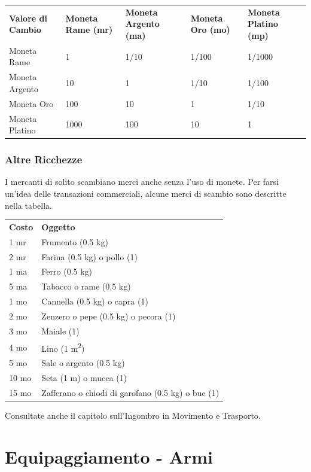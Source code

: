 \documentclass[a4paper,11pt,twoside,openany]{book}
\begin{document}
\begin{tabular}{L{3cm} L{3cm} L{3cm} L{3cm} L{3cm}}
	\toprule
	\textbf{Valore di Cambio} & \textbf{Moneta Rame (mr)} & \textbf{Moneta Argento (ma)} & \textbf{Moneta Oro (mo)} & \textbf{Moneta Platino (mp)}\\
	Moneta Rame& 1& 1/10& 1/100& 1/1000\\
	Moneta Argento  & 10    & 1   & 1/10 & 1/100\\
	Moneta Oro & 100   & 10  & 1    & 1/10\\
	Moneta Platino  & 1000  & 100 & 10   & 1\\
\end{tabular}

\subsubsection{Altre Ricchezze}

I mercanti di solito scambiano merci anche senza l'uso di monete.
Per farsi un'idea delle transazioni commerciali, alcune merci di scambio sono descritte nella tabella.

\medskip

\begin{tabular}{ll}
	\toprule
	\textbf{Costo} & \textbf{Oggetto}\\
	1 mr & Frumento (0.5 kg)\\
	2 mr & Farina (0.5 kg) o pollo (1)\\
	1 ma & Ferro (0.5 kg)\\
	5 ma & Tabacco o rame (0.5 kg)\\
	1 mo & Cannella (0.5 kg) o capra (1)\\
	2 mo & Zenzero o pepe (0.5 kg) o pecora (1)\\
	3 mo & Maiale (1)\\
	4 mo & Lino (1 m\textsuperscript{2})\\
	5 mo & Sale o argento (0.5 kg)\\
	10 mo& Seta (1 m) o mucca (1)\\
	15 mo& Zafferano o chiodi di garofano (0.5 kg) o bue (1)\\
\end{tabular}

\medskip

Consultate anche il capitolo sull'Ingombro in Movimento e Trasporto.

\pagebreak

\section{Equipaggiamento - Armi}
\end{document}
